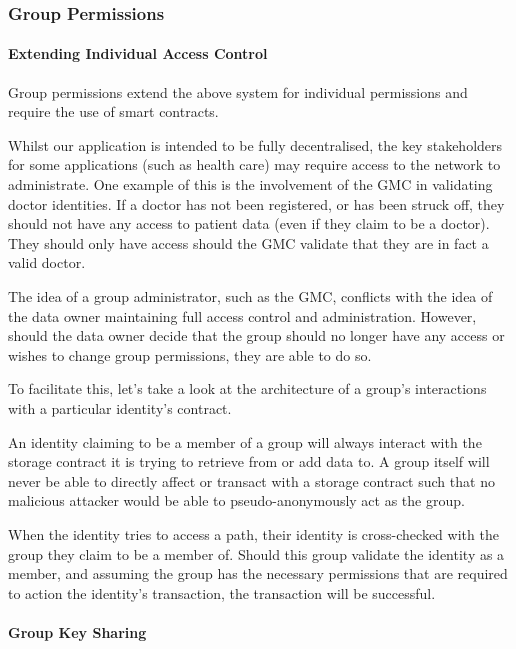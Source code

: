 \subsubsection{Group Permissions}

\paragraph{Extending Individual Access Control}

Group permissions extend the above system for individual permissions and require the use of smart contracts.

Whilst our application is intended to be fully decentralised, the key stakeholders for some applications (such as health care) may require access to the network to administrate. One example of this is the involvement of the GMC in validating doctor identities. If a doctor has not been registered, or has been struck off, they should not have any access to patient data (even if they claim to be a doctor). They should only have access should the GMC validate that they are in fact a valid doctor.

The idea of a group administrator, such as the GMC, conflicts with the idea of the data owner maintaining full access control and administration. However, should the data owner decide that the group should no longer have any access or wishes to change group permissions, they are able to do so.

To facilitate this, let's take a look at the architecture of a group's interactions with a particular identity's contract.



An identity claiming to be a member of a group will always interact with the storage contract it is trying to retrieve from or add data to. A group itself will never be able to directly affect or transact with a storage contract such that no malicious attacker would be able to pseudo-anonymously act as the group.

When the identity tries to access a path, their identity is cross-checked with the group they claim to be a member of. Should this group validate the identity as a member, and assuming the group has the necessary permissions that are required to action the identity's transaction, the transaction will be successful.

\paragraph{Group Key Sharing}

